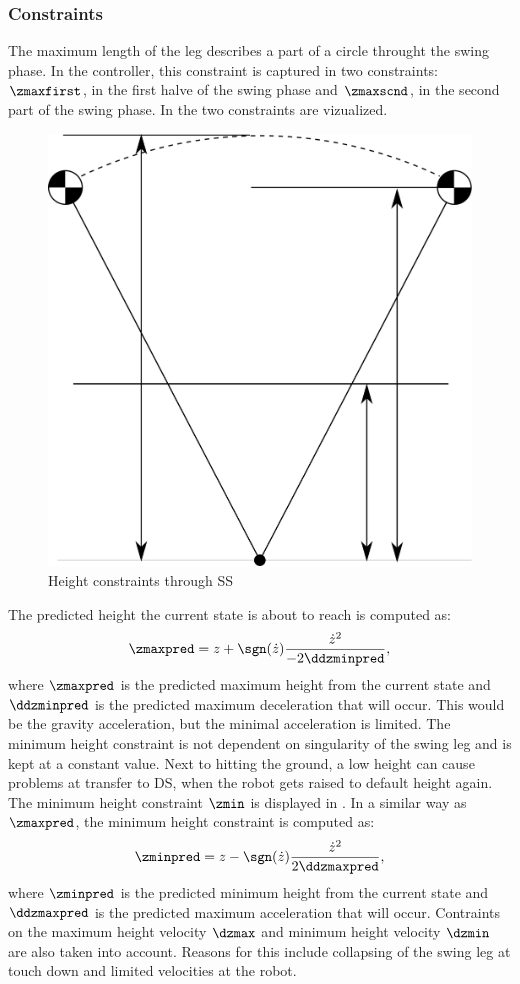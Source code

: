 \subsubsection{Constraints}
The maximum length of the leg describes a part of a circle throught the swing phase. In the controller, this constraint is captured in two constraints: $\zmaxfirst$, in the first halve of the swing phase and $\zmaxscnd$, in the second part of the swing phase. In  the two constraints are vizualized. 
\begin{figure}[h]
\centering
  \includegraphics[width=.4\linewidth]{STYLESTUFF/heightconstraints.png}
   \caption{Height constraints through \ac{SS}}
    \label{fig:heightconstraints}
\end{figure} 
The predicted height the current state is about to reach is computed as:
\begin{equation}
	\zmaxpred = z + \sgn(\dot{z})\frac{\dot{z}^2}{-2\ddzminpred},
\end{equation}
where $\zmaxpred$ is the predicted maximum height from the current state and $\ddzminpred$ is the predicted maximum deceleration that will occur. This would be the gravity acceleration, but the minimal acceleration is limited. 
\paraskip
The minimum height constraint is not dependent on singularity of the swing leg and is kept at a constant value. Next to hitting the ground, a low height can cause problems at transfer to \ac{DS}, when the robot gets raised to default height again. The minimum height constraint $\zmin$ is displayed in . In a similar way as $\zmaxpred$, the minimum height constraint is computed as:
\begin{equation}
	\zminpred = z - \sgn(\dot{z})\frac{\dot{z}^2}{2\ddzmaxpred},
\end{equation}
where $\zminpred$ is the predicted minimum height from the current state and $\ddzmaxpred$ is the predicted maximum acceleration that will occur.
\paraskip
Contraints on the maximum height velocity $\dzmax$ and minimum height velocity $\dzmin$ are also taken into account. Reasons for this include collapsing of the swing leg at touch down and limited velocities at the robot. 



